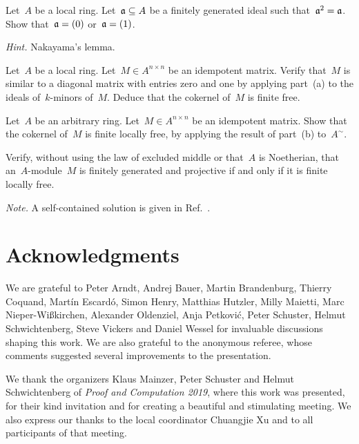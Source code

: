 \documentclass{ws-rv9x6}
\begin{document}
{\begin{exercise}%
\begin{alphlist}[(c)]
\item Let~$A$ be a local ring. Let~$\mathfrak{a} \subseteq A$ be a finitely generated
ideal such that~$\mathfrak{a}^2 = \mathfrak{a}$. Show that~$\mathfrak{a} = (0)$ or~$\mathfrak{a} = (1)$.\smallskip

{\scriptsize\emph{Hint.} Nakayama's lemma.\par}
\item Let~$A$ be a local ring. Let~$M \in A^{n \times n}$ be an idempotent
matrix. Verify that~$M$ is similar to a diagonal matrix with entries zero and
one by applying part~(a) to the ideals of~$k$-minors of~$M$. Deduce that the
cokernel of~$M$ is finite free.
\item Let~$A$ be an arbitrary ring. Let~$M \in A^{n \times n}$ be an idempotent
matrix. Show that the cokernel of~$M$ is finite locally free, by applying the
result of part~(b) to~$A^\sim$.
\item Verify, without using the law of excluded middle or that~$A$ is
Noetherian, that an~$A$-module~$M$ is finitely generated and projective if and
only if it is finite locally free.\smallskip

{\scriptsize\emph{Note.} A self-contained solution is given in
Ref.~.\par}
\end{alphlist}
\end{exercise}


\section*{Acknowledgments}

We are grateful to Peter Arndt, Andrej Bauer,
Martin Brandenburg, Thierry Coquand, Martín Escardó, Simon Henry, Matthias
Hutzler, Milly Maietti, Marc Nieper-Wißkirchen, Alexander Oldenziel, Anja
Petković, Peter Schuster, Helmut Schwichtenberg, Steve Vickers and Daniel
Wessel for invaluable discussions shaping this work. We are also grateful to
the anonymous referee, whose comments suggested several improvements to the
presentation.

We thank the
organizers Klaus Mainzer, Peter Schuster and Helmut Schwich\-ten\-berg of
\emph{Proof and Computation 2019}, where this work was presented, for their
kind invitation and for creating a beautiful and stimulating meeting. We also
express our thanks to the local coordinator Chuangjie Xu and to all
participants of that meeting.

}




\end{document}
